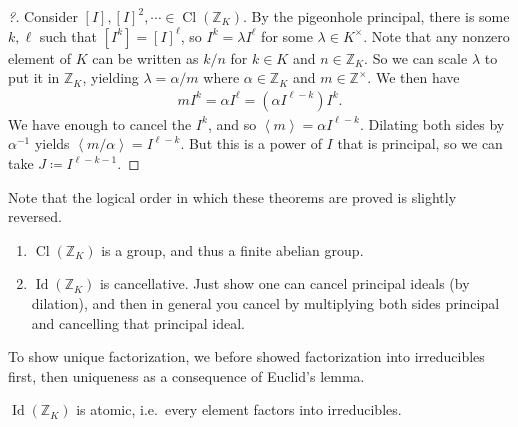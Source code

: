 \begin{proof}[?]

Consider \([I], [I]^2, \cdots \in \operatorname{Cl}({\mathbb{Z}}_K)\).
By the pigeonhole principal, there is some \(k, \ell\) such that
\([I^k] = [I]^\ell\), so \(I^k = \lambda I^\ell\) for some
\(\lambda \in K^{\times}\). Note that any nonzero element of \(K\) can
be written as \(k/n\) for \(k\in K\) and \(n\in {\mathbb{Z}}_K\). So we
can scale \(\lambda\) to put it in \({\mathbb{Z}}_K\), yielding
\(\lambda = \alpha/m\) where \(\alpha\in {\mathbb{Z}}_K\) and
\(m\in {\mathbb{Z}}^{\times}\). We then have
\begin{align*}
mI^k = \alpha I^\ell = (\alpha I^{\ell-k})I^k
.\end{align*}
We have enough to cancel the \(I^k\), and so
\(\left\langle{ m }\right\rangle= \alpha I^{\ell - k}\). Dilating both
sides by \(\alpha^{-1}\) yields
\(\left\langle{ m/\alpha }\right\rangle = I^{\ell-k}\). But this is a
power of \(I\) that is principal, so we can take
\(J \coloneqq I^{\ell-k-1}\).

\end{proof}

\begin{remark}

Note that the logical order in which these theorems are proved is
slightly reversed.

\end{remark}

\begin{corollary}[?]

\envlist

\begin{enumerate}
\def\labelenumi{\alph{enumi}.}
\item
  \(\operatorname{Cl}({\mathbb{Z}}_K)\) is a group, and thus a finite
  abelian group.
\item
  \(\operatorname{Id}({\mathbb{Z}}_K)\) is cancellative. Just show one
  can cancel principal ideals (by dilation), and then in general you
  cancel by multiplying both sides principal and cancelling that
  principal ideal.
\end{enumerate}

To show unique factorization, we before showed factorization into
irreducibles first, then uniqueness as a consequence of Euclid's lemma.

\end{corollary}

\begin{lemma}[?]

\(\operatorname{Id}({\mathbb{Z}}_K)\) is atomic, i.e.~every element
factors into irreducibles.

\end{lemma}

